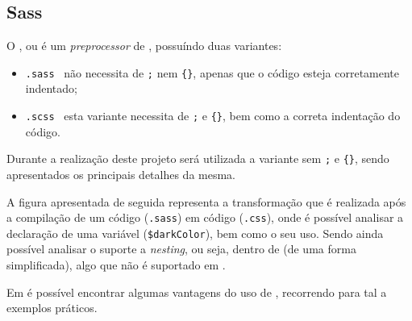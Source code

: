 \subsection{Sass}

\begin{minipage}{.3\textwidth}
\end{minipage}
\begin{minipage}{.7\textwidth}
	\minipagerestore
	O \textbf{}, ou \underline{} é um \textit{preprocessor} de \textbf{}, possuíndo duas variantes:

	\begin{itemize}
		\item \texttt{.sass} \textemdash~não necessita de \texttt{;} nem \verb|{}|, apenas que o código esteja corretamente indentado;
		\item \texttt{.scss} \textemdash~esta variante necessita de \texttt{;} e \verb|{}|, bem como a correta indentação do código.
	\end{itemize}
\end{minipage}

Durante a realização deste projeto será utilizada a variante sem \texttt{;} e \verb|{}|, sendo apresentados os principais detalhes da mesma.

A figura apresentada de seguida representa a transformação que é realizada após a compilação de um código \textbf{} (\texttt{.sass}) em código \textbf{} (\texttt{.css}), onde é possível analisar a declaração de uma variável (\verb|$darkColor|), bem como o seu uso. Sendo ainda possível analisar o suporte a \textit{nesting}, ou seja, \textbf{} dentro de \textbf{} (de uma forma simplificada), algo que não é suportado em \textbf{}.

\clearpage


Em  é possível encontrar algumas vantagens do uso de \textbf{}, recorrendo para tal a exemplos práticos.